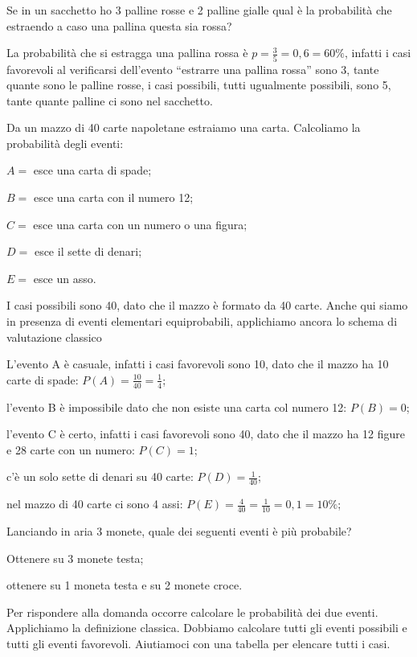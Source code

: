 \begin{exrig}
\begin{esempio}
Se in un sacchetto ho 3 palline rosse e 2 palline gialle qual è la probabilità che estraendo a caso una pallina questa sia rossa?

La probabilità che si estragga una pallina rossa è $p=\frac 3 5=0,6=60\text{\%}$, infatti i casi favorevoli al verificarsi dell'evento “estrarre una pallina rossa” sono 3, tante quante sono le palline rosse, i casi possibili, tutti ugualmente possibili, sono 5, tante quante palline ci sono nel sacchetto.
\end{esempio}

\begin{esempio}
Da un mazzo di 40 carte napoletane estraiamo una carta. Calcoliamo la probabilità degli eventi:
\begin{itemize*}
\item $A=$ esce una carta di spade;
\item $B=$ esce una carta con il numero 12;
\item $C=$ esce una carta con un numero o una figura;
\item $D=$ esce il sette di denari;
\item $E=$ esce un asso.
\end{itemize*}
I casi possibili sono 40, dato che il mazzo è formato da 40 carte. Anche qui siamo in presenza di eventi elementari equiprobabili, applichiamo ancora lo schema di valutazione classico
\begin{itemize*}
\item L'evento A è casuale, infatti i casi favorevoli sono 10, dato che il mazzo ha 10 carte di spade: $P(A)=\frac{10}{40}=\frac 1 4$;
\item l'evento B è impossibile dato che non esiste una carta col numero 12: $ P(B)=0 $;
\item l'evento C è certo, infatti i casi favorevoli sono 40, dato che il mazzo ha 12 figure e 28 carte con un numero: $P(C)=1$;
\item c'è un solo sette di denari su 40 carte: $P(D)=\frac 1{40}$;
\item nel mazzo di 40 carte ci sono 4 assi: $P(E)=\frac 4{40}=\frac 1{10}=0,1=10\%$;
\end{itemize*}
\end{esempio}

\begin{esempio}
Lanciando in aria 3 monete, quale dei seguenti eventi è più probabile?
\begin{itemize*}
\item Ottenere su 3 monete testa;
\item ottenere su 1 moneta testa e su 2 monete croce.
\end{itemize*}
Per rispondere alla domanda occorre calcolare le probabilità dei due eventi. Applichiamo la definizione classica. Dobbiamo calcolare tutti gli eventi possibili e tutti gli eventi favorevoli.
Aiutiamoci con una tabella per elencare tutti i casi.


\end{esempio}
\end{exrig}
